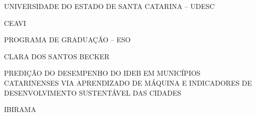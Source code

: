 

\renewcommand{\imprimircapa}{%
	\begin{capa}%
		\center

		{\fontseries{b}\selectfont\MakeTextUppercase{UNIVERSIDADE DO ESTADO DE SANTA CATARINA -- UDESC}}
		
		{\fontseries{b}\selectfont\MakeTextUppercase{CEAVI }}
		
		{\fontseries{b}\selectfont\MakeTextUppercase{PROGRAMA DE GRADUAÇÃO -- ESO  }}
		
		\vfill
		
		{\fontseries{b}\selectfont\MakeTextUppercase{\normalsize}{CLARA DOS SANTOS BECKER}}
		
		\vfill
		\begin{center}
		{\fontseries{b}\selectfont\MakeTextUppercase{\normalsize}{PREDIÇÃO DO DESEMPENHO DO IDEB EM MUNICÍPIOS CATARINENSES VIA APRENDIZADO DE MÁQUINA E INDICADORES DE DESENVOLVIMENTO SUSTENTÁVEL DAS CIDADES}}
		\end{center}
		\vfill
		
		\vfill
		
		{\fontseries{b}\selectfont\MakeTextUppercase{IBIRAMA}}
		\par
		{\selectfont \imprimirdata}
		\vspace*{1cm}
	\end{capa}
}



\imprimircapa				%


